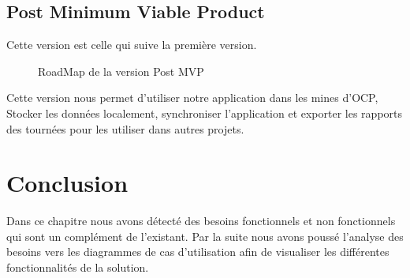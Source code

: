 \subsection{Post Minimum Viable Product}
Cette version est celle qui suive la premi\`ere version.
\begin{figure}[H]
	\caption{\label{fig:my-label} RoadMap de la version Post \gls{MVP}}
\end{figure}

Cette version nous permet d'utiliser notre application dans les mines d'\gls{OCP}, Stocker les donn\'ees localement, synchroniser l'application et exporter les rapports des tourn\'ees pour les utiliser dans autres projets. 

 
\section{Conclusion}
Dans ce chapitre nous avons d\'etect\'e des besoins fonctionnels et non fonctionnels qui sont un compl\'ement de l'existant. Par la suite nous avons pouss\'e l'analyse des besoins vers les diagrammes de cas d'utilisation afin de visualiser les diff\'erentes fonctionnalit\'es de la solution.